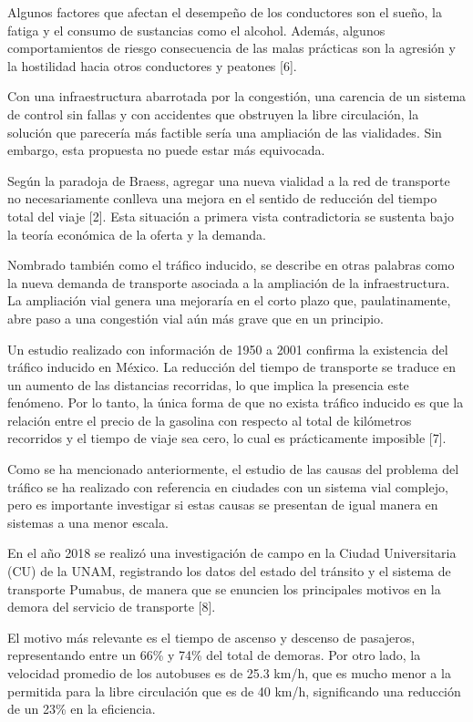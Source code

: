 \documentclass[12pt]{article}
\begin{document}
    Algunos factores que afectan el desempeño de los conductores son el sueño, la fatiga y el consumo de sustancias como el alcohol. Además, algunos comportamientos de riesgo consecuencia de las malas prácticas son la agresión y la hostilidad hacia otros conductores y peatones [6].

    Con una infraestructura abarrotada por la congestión, una carencia de un sistema de control sin fallas y con accidentes que obstruyen la libre circulación, la solución que parecería más factible sería una ampliación de las vialidades. Sin embargo, esta propuesta no puede estar más equivocada. 

    Según la paradoja de Braess, agregar una nueva vialidad a la red de transporte no necesariamente conlleva una mejora en el sentido de reducción del tiempo total del viaje [2]. Esta situación a primera vista contradictoria se sustenta bajo la teoría económica de la oferta y la demanda.

    Nombrado también como el tráfico inducido, se describe en otras palabras como la nueva demanda de transporte asociada a la ampliación de la infraestructura. La ampliación vial genera una mejoraría en el corto plazo que, paulatinamente, abre paso a una congestión vial aún más grave que en un principio. 

    Un estudio realizado con información de 1950 a 2001 confirma la existencia del tráfico inducido en México. La reducción del tiempo de transporte se traduce en un aumento de las distancias recorridas, lo que implica la presencia este fenómeno. Por lo tanto, la única forma de que no exista tráfico inducido es que la relación entre el precio de la gasolina con respecto al total de kilómetros recorridos y el tiempo de viaje sea cero, lo cual es prácticamente imposible [7].

    Como se ha mencionado anteriormente, el estudio de las causas del problema del tráfico se ha realizado con referencia en ciudades con un sistema vial complejo, pero es importante investigar si estas causas se presentan de igual manera en sistemas a una menor escala. 

    En el año 2018 se realizó una investigación de campo en la Ciudad Universitaria (CU) de la UNAM, registrando los datos del estado del tránsito y el sistema de transporte Pumabus, de manera que se enuncien los principales motivos en la demora del servicio de transporte [8].

    El motivo más relevante es el tiempo de ascenso y descenso de pasajeros, representando entre un 66\% y 74\% del total de demoras. Por otro lado, la velocidad promedio de los autobuses es de 25.3 km/h, que es mucho menor a la permitida para la libre circulación que es de 40 km/h, significando una reducción de un 23\% en la eficiencia.
    
\end{document}
